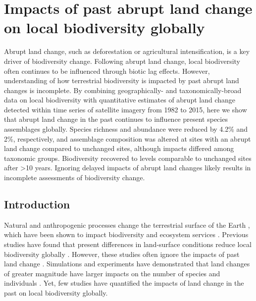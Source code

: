 \chapter{ Impacts of past abrupt land change on local biodiversity globally}

Abrupt land change, such as deforestation or agricultural intensification, is a key driver of biodiversity change. Following abrupt land change, local biodiversity often continues to be influenced through biotic lag effects. However, understanding of how terrestrial biodiversity is impacted by past abrupt land changes is incomplete. By combining geographically- and taxonomically-broad data on local biodiversity with quantitative estimates of abrupt land change detected within time series of satellite imagery from 1982 to 2015, here we show that abrupt land change in the past continues to influence present species assemblages globally. Species richness and abundance were reduced by 4.2\% and 2\%, respectively, and assemblage composition was altered at sites with an abrupt land change compared to unchanged sites, although impacts differed among taxonomic groups. Biodiversity recovered to levels comparable to unchanged sites after >10 years. Ignoring delayed impacts of abrupt land changes likely results in incomplete assessments of biodiversity change.

\section{Introduction}
Natural and anthropogenic processes change the terrestrial surface of the Earth \citep{Ellis2013,Song2018}, which have been shown to impact biodiversity \citep{Newbold2015,Jung2018} and ecosystem services \citep{Isbell2015}. Previous studies have found that present differences in land-surface conditions reduce local biodiversity globally \citep{Gibson2011,Newbold2015}. However, these studies often ignore the impacts of past land change \citep{Foster2003,Watson2014}. Simulations and experiments have demonstrated that land changes of greater magnitude have larger impacts on the number of species and individuals \citep{Dornelas2010,Hautier2015,Santini2016}. Yet, few studies have quantified the impacts of land change in the past on local biodiversity globally.

